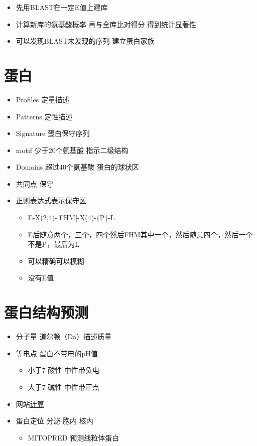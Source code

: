 \documentclass[]{book}
\providecommand{\tightlist}{%
  \setlength{\itemsep}{0pt}\setlength{\parskip}{0pt}}
\begin{document}
\begin{itemize}
\tightlist
\item
  先用BLAST在一定E值上建库
\item
  计算新库的氨基酸概率 再与全库比对得分 得到统计显著性
\item
  可以发现BLAST未发现的序列 建立蛋白家族
\end{itemize}

\section{蛋白}

\begin{itemize}
\tightlist
\item
  Profiles 定量描述
\item
  Patterns 定性描述
\item
  Signature 蛋白保守序列
\item
  motif 少于20个氨基酸 指示二级结构
\item
  Domains 超过40个氨基酸 蛋白的球状区
\item
  共同点 保守
\item
  正则表达式表示保守区

  \begin{itemize}
  \tightlist
  \item
    E-X(2,4)-{[}FHM{]}-X(4)-\{P\}-L
  \item
    E后随意两个，三个，四个然后FHM其中一个，然后随意四个，然后一个不是P，最后为L
  \item
    可以精确可以模糊
  \item
    没有E值
  \end{itemize}
\end{itemize}

\section{蛋白结构预测}

\begin{itemize}
\tightlist
\item
  分子量 道尔顿（Da）描述质量
\item
  等电点 蛋白不带电的pH值

  \begin{itemize}
  \tightlist
  \item
    小于7 酸性 中性带负电
  \item
    大于7 碱性 中性带正点
  \end{itemize}
\item
  网站\href{http://web.expasy.org/compute_pi/}{计算}
\item
  蛋白定位 分泌 胞内 核内

  \begin{itemize}
  \tightlist
  \item
    MITOPRED 预测线粒体蛋白
  \end{itemize}
\end{itemize}
\end{document}
